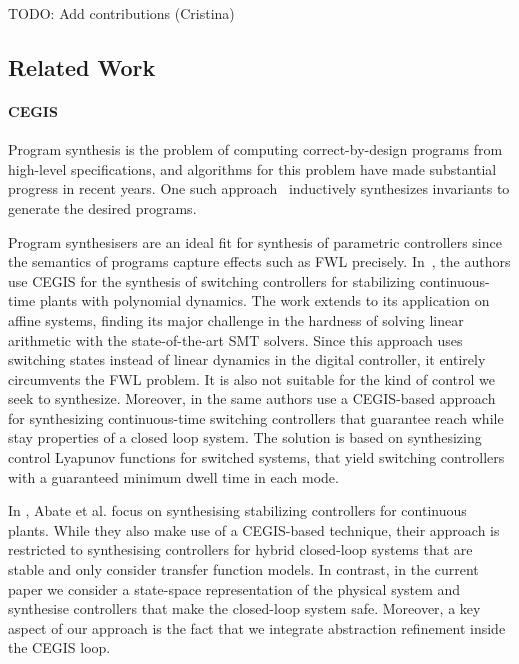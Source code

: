 \documentclass[runningheads,a4paper]{llncs}
\newcommand{\todo}[1]{{\color{red} TODO: #1}}
\begin{document}

\todo{Add contributions (Cristina)}

\subsection{Related Work}
\label{sec:relw}

\paragraph{CEGIS}

Program synthesis is the problem of computing correct-by-design programs
from high-level specifications, and algorithms for this problem have made
substantial progress in recent years.  One such
approach~\cite{itzhaky2010simple} inductively synthesizes invariants to
generate the desired programs.

Program synthesisers are an ideal fit for synthesis of parametric
controllers since the semantics of programs capture effects such as FWL
precisely.  In~\cite{DBLP:conf/cdc/RavanbakhshS15}, the authors use CEGIS
for the synthesis of switching controllers for stabilizing continuous-time
plants with polynomial dynamics.  The work extends to its application on
affine systems, finding its major challenge in the hardness of solving
linear arithmetic with the state-of-the-art SMT solvers.  Since this
approach uses switching states instead of linear dynamics in the digital
controller, it entirely circumvents the FWL problem.  It is also not
suitable for the kind of control we seek to synthesize.
Moreover, in \cite{DBLP:conf/emsoft/RavanbakhshS16} the same authors 
use a CEGIS-based approach for synthesizing continuous-time switching
controllers that guarantee reach while stay properties of a closed
loop system. The solution is based on synthesizing control Lyapunov
functions for switched systems, that yield switching controllers with
a guaranteed minimum dwell time in each mode.

In \cite{DBLP:journals/corr/AbateBCCDKK16}, Abate et al.  focus on
synthesising stabilizing controllers for continuous plants.  While
they also make use of a CEGIS-based technique, their approach is
restricted to synthesising controllers for hybrid closed-loop systems
that are stable and only consider transfer function models.  In contrast,
in the current paper we consider a state-space
representation of the physical system and synthesise controllers that
make the closed-loop system safe.  Moreover, 
a key aspect of our approach
is the fact that we integrate abstraction
refinement inside the CEGIS loop.
\end{document}
